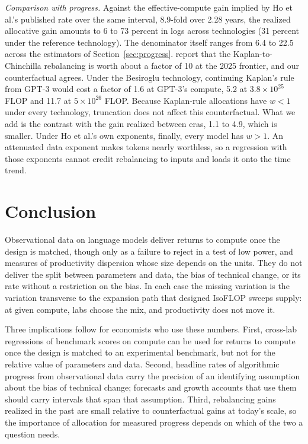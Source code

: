 \documentclass[AER,finalmode]{AEA}
\theoremstyle{definition}
\theoremstyle{remark}
\begin{document}
\textit{Comparison with progress.} Against the effective-compute gain implied by Ho et al.'s published rate over the
same interval, 8.9-fold over 2.28 years, the realized allocative gain amounts to 6 to 73 percent in logs across
technologies (31 percent under the reference technology). The denominator itself ranges from 6.4 to 22.5 across the
estimators of Section~\ref{sec:progress}. \citet{gundlach2025origin} report that the Kaplan-to-Chinchilla rebalancing
is worth about a factor of 10 at the 2025 frontier, and our counterfactual agrees. Under the Besiroglu technology,
continuing Kaplan's rule from GPT-3 would cost a factor of 1.6 at GPT-3's compute, 5.2 at $3.8\times10^{25}$ FLOP and
11.7 at $5\times10^{26}$ FLOP. Because Kaplan-rule allocations have $w<1$ under every technology, truncation does not
affect this counterfactual. What we add is the contrast with the gain realized between eras, 1.1 to 4.9, which is
smaller. Under Ho et al.'s own exponents, finally, every model has $w>1$. An attenuated data exponent makes tokens
nearly worthless, so a regression with those exponents cannot credit rebalancing to inputs and loads it onto the time
trend.

\section{Conclusion}\label{sec:conclusion}

Observational data on language models deliver returns to compute once the design is matched, though only as a failure
to reject in a test of low power, and measures of productivity dispersion whose size depends on the units. They do not
deliver the split between parameters and data, the bias of technical change, or its rate without a restriction on the
bias. In each case the missing variation is the variation transverse to the expansion path that designed IsoFLOP
sweeps supply: at given compute, labs choose the mix, and productivity does not move it.

Three implications follow for economists who use these numbers. First, cross-lab regressions of benchmark scores on
compute can be used for returns to compute once the design is matched to an experimental benchmark, but not for the
relative value of parameters and data. Second, headline rates of algorithmic progress from observational
data carry the precision of an identifying assumption about the bias of technical change; forecasts and growth
accounts that use them should carry intervals that span that assumption. Third, rebalancing gains realized in the past
are small relative to counterfactual gains at today's scale, so the importance of allocation for measured progress
depends on which of the two a question needs.
\end{document}
